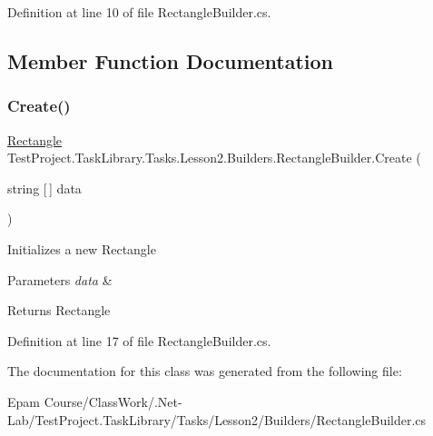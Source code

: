 Definition at line 10 of file Rectangle\+Builder.\+cs.



\subsection{Member Function Documentation}
\mbox{\label{class_test_project_1_1_task_library_1_1_tasks_1_1_lesson2_1_1_builders_1_1_rectangle_builder_a3bbb2ea6b6d06e27dafaa8d7d231b8d3}} 
\subsubsection{\texorpdfstring{Create()}{Create()}}
{\footnotesize\ttfamily \mbox{\hyperlink{struct_test_project_1_1_task_library_1_1_tasks_1_1_lesson2_1_1_models_1_1_rectangle}{Rectangle}} Test\+Project.\+Task\+Library.\+Tasks.\+Lesson2.\+Builders.\+Rectangle\+Builder.\+Create (\begin{DoxyParamCaption}\item[{string \mbox{[}$\,$\mbox{]}}]{data }\end{DoxyParamCaption})}



Initializes a new Rectangle 


\begin{DoxyParams}{Parameters}
{\em data} & \\
\hline
\end{DoxyParams}
\begin{DoxyReturn}{Returns}
Rectangle
\end{DoxyReturn}


Definition at line 17 of file Rectangle\+Builder.\+cs.



The documentation for this class was generated from the following file\+:\begin{DoxyCompactItemize}
\item 
Epam Course/\+Class\+Work/.\+Net-\/\+Lab/\+Test\+Project.\+Task\+Library/\+Tasks/\+Lesson2/\+Builders/Rectangle\+Builder.\+cs\end{DoxyCompactItemize}

